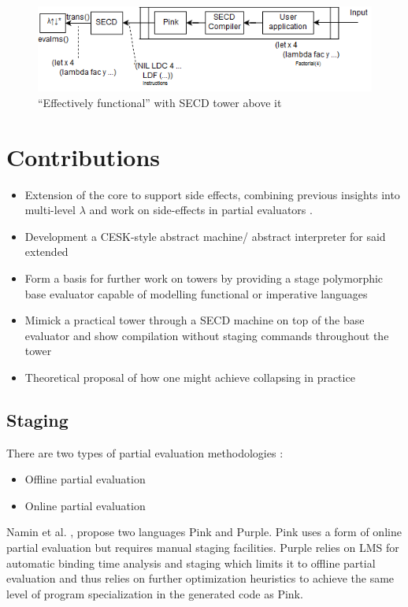 \documentclass{article}
\begin{document}
\begin{figure}[t]
	\centering
	\includegraphics[scale=0.75]{secd_arch.png}
	\caption{``Effectively functional'' \mslangStar with SECD tower above it}\label{secd_tower_arch}
\end{figure}

\section{Contributions}
\begin{itemize}
	\item Extension of the core \mslang to support side effects, combining previous insights into multi-level $\lambda$ \cite{nielson1996multi} and work on side-effects in partial evaluators \cite{asai1997partial}.
	\item Development a CESK-style abstract machine/ abstract interpreter for said extended \mslang
	\item Form a basis for further work on towers by providing a stage polymorphic base evaluator capable of modelling functional or imperative languages
	\item Mimick a practical tower through a SECD machine on top of the base evaluator and show compilation without staging commands throughout the tower
	\item Theoretical proposal of how one might achieve collapsing in practice
\end{itemize}

\subsection{Staging}
There are two types of partial evaluation methodologies \cite{jones1993partial}:
\begin{itemize}
	\item Offline partial evaluation
	\item Online partial evaluation
\end{itemize}
Namin et al. \cite{amin2017collapsing}, propose two languages Pink and Purple. Pink uses a form of online partial evaluation but requires manual staging facilities. Purple relies on LMS for automatic binding time analysis and staging
which limits it to offline partial evaluation and thus relies on further optimization heuristics to achieve the same level of program specialization in the generated code as Pink.
\end{document}
